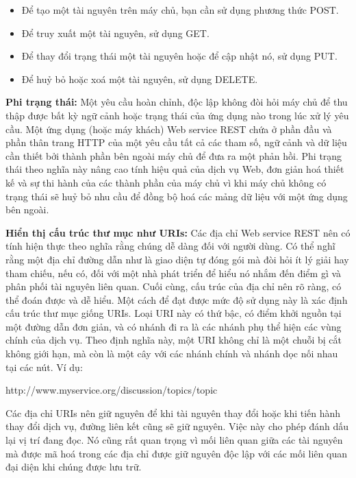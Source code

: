 \documentclass[11pt,a4paper,oneside]{book}
\begin{document}
\begin{itemize}[topsep=1mm,itemsep=-0.5mm]
\item Để tạo một tài nguyên trên máy chủ, bạn cần sử dụng phương thức POST.
\item Để truy xuất một tài nguyên, sử dụng GET.
\item Để thay đổi trạng thái một tài nguyên hoặc để cập nhật nó, sử dụng PUT.
\item Để huỷ bỏ hoặc xoá một tài nguyên, sử dụng DELETE.
\vspace{1mm}
\end{itemize}

\textbf{Phi trạng thái:} Một yêu cầu hoàn chỉnh, độc lập không đòi hỏi máy chủ để thu thập được bất kỳ ngữ cảnh hoặc trạng thái của ứng dụng nào trong lúc xử lý yêu cầu. Một ứng dụng (hoặc máy khách) Web service REST chứa ở phần đầu và phần thân trang HTTP của một yêu cầu tất cả các tham số, ngữ cảnh và dữ liệu cần thiết bởi thành phần bên ngoài máy chủ để đưa ra một phản hồi. Phi trạng thái theo nghĩa này nâng cao tính hiệu quả của dịch vụ Web, đơn giản hoá thiết kế và sự thi hành của các thành phần của máy chủ vì khi máy chủ không có trạng thái sẽ huỷ bỏ nhu cầu để đồng bộ hoá các mảng dữ liệu với một ứng dụng bên ngoài.

\textbf{Hiển thị cấu trúc thư mục như URIs:} Các địa chỉ Web service REST nên có tính hiện thực theo nghĩa rằng chúng dễ dàng đối với người dùng. Có thể nghĩ rằng một địa chỉ đường dẫn như là giao diện tự đóng gói mà đòi hỏi ít lý giải hay tham chiếu, nếu có, đối với một nhà phát triển để hiểu nó nhắm đến điểm gì và phân phối tài nguyên liên quan. Cuối cùng, cấu trúc của địa chỉ nên rõ ràng, có thể đoán được và dễ hiểu.
Một cách để đạt được mức độ sử dụng này là xác định cấu trúc thư mục giống URIs. Loại URI này có thứ bậc, có điểm khởi nguồn tại một đường dẫn đơn giản, và có nhánh đi ra là các nhánh phụ thể hiện các vùng chính của dịch vụ. Theo định nghĩa này, một URI không chỉ là một chuỗi bị cắt không giới hạn, mà còn là một cây với các nhánh chính và nhánh dọc nối nhau tại các nút. Ví dụ:

http://www.myservice.org/discussion/topics/{topic}

Các địa chỉ URIs nên giữ nguyên để khi tài nguyên thay đổi hoặc khi tiến hành thay đổi dịch vụ, đường liên kết cũng sẽ giữ nguyên. Việc này cho phép đánh dấu lại vị trí đang đọc. Nó cũng rất quan trọng vì mối liên quan giữa các tài nguyên mà được mã hoá trong các địa chỉ được giữ nguyên độc lập với các mối liên quan đại diện khi chúng được lưu trữ.
\end{document}
